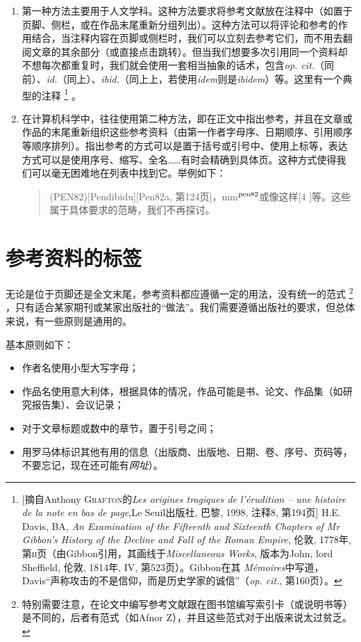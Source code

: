\begin{enumerate}
    \item 第一种方法主要用于人文学科。这种方法要求将参考文献放在注释中（如置于页脚、侧栏，或在作品末尾重新分组列出）。这种方法可以将评论和参考的作用结合，当注释内容在页脚或侧栏时，我们可以立刻去参考它们，而不用去翻阅文章的其余部分（或直接点击跳转）。但当我们想要多次引用同一个资料却不想每次都重复时，我们就会使用一套相当抽象的话术，包含\emph{op. cit.}（同前）、\emph{id.}（同上）、\emph{ibid.}（同上上，若使用\emph{idem}则是\emph{ibidem}）等。这里有一个典型的注释
        \footnote{[摘自Anthony \textsc{Grafton}的\emph{Les origines tragiques de l'érudition – une histoire de la note en bas de page},Le Seuil出版社, 巴黎, 1998, 注释8, 第194页] H.E. Davis, BA, \emph{An Examination of the Fifteenth and Sixteenth Chapters of Mr Gibbon's History of the Decline and Fall of the Roman Empire}, 伦敦, 1778年, 第\textsc{ii}页（由Gibbon引用，其画线于\emph{Miscellaneous Works}, 版本为John, lord Sheffield, 伦敦, 1814年, IV, 第523页）。Gibbon在其\emph{ Mémoires}中写道，Davis``声称攻击的不是信仰，而是历史学家的诚信''（\emph{op. cit.}, 第160页）。}
    。
    \item 在计算机科学中，往往使用第二种方法，即在正文中指出参考，并且在文章或作品的末尾重新组织这些参考资料（由第一作者字母序、日期顺序、引用顺序等顺序排列）。指出参考的方式可以是置于括号或引号中、使用上标等，表达方式可以是使用序号、缩写、全名……有时会精确到具体页。这种方式使得我们可以毫无困难地在列表中找到它。举例如下：
    
    \begin{quote}
        (PEN82)[Pendibidu][Pen82a, 第124页]，mm$^{\rm pen82}$或像这样[4%
        ]等。这些属于具体要求的范畴，我们不再探讨。
    \end{quote}
\end{enumerate}

\section{参考资料的标签}

无论是位于页脚还是全文末尾，参考资料都应遵循一定的用法，没有统一的范式
    \footnote{特别需要注意，在论文中编写参考文献跟在图书馆编写索引卡（或说明书等）是不同的，后者有范式（如Afnor Z），并且这些范式对于出版来说太过贫乏。}
，只有适合某家期刊或某家出版社的``做法''。我们需要遵循出版社的要求，但总体来说，有一些原则是通用的。

\begin{mdframed}
    基本原则如下：
    \begin{itemize}
        \item 作者名使用小型大写字母；
        \item 作品名使用意大利体，根据具体的情况，作品可能是书、论文、作品集（如研究报告集）、会议记录；
        \item 对于文章标题或数中的章节，置于引号之间；
        \item 用罗马体标识其他有用的信息（出版商、出版地、日期、卷、序号、页码等，不要忘记，现在还可能有\emph{网址}）。
    \end{itemize}
\end{mdframed}

